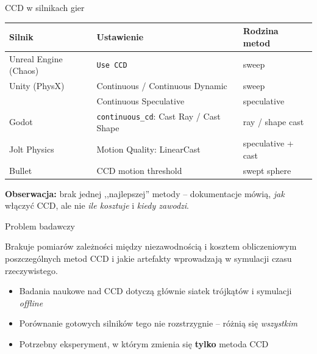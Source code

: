 \documentclass[aspectratio=169, 11pt]{beamer}
\begin{document}
\begin{frame}{CCD w silnikach gier}
  \small
  \renewcommand{\arraystretch}{1.25}
  \begin{tabular}{@{}lll@{}}
    \toprule
    \textbf{Silnik} & \textbf{Ustawienie} & \textbf{Rodzina metod} \\
    \midrule
    Unreal Engine (Chaos) & \texttt{Use CCD} & sweep \\
    Unity (PhysX) & Continuous / Continuous Dynamic & sweep \\
                  & Continuous Speculative & speculative \\
    Godot & \texttt{continuous\_cd}: Cast Ray / Cast Shape & ray / shape cast \\
    Jolt Physics & Motion Quality: LinearCast & speculative + cast \\
    Bullet & CCD motion threshold & swept sphere \\
    \bottomrule
  \end{tabular}
  \vspace{0.35cm}
 
  \normalsize
  {\color{PwrRed}\bfseries Obserwacja:} brak jednej ,,najlepszej'' metody -- dokumentacje mówią, \emph{jak} włączyć CCD, ale nie \emph{ile kosztuje} i \emph{kiedy zawodzi}.
\end{frame}
 
\begin{frame}{Problem badawczy}
  \begin{block}{}
    \large
    Brakuje pomiarów zależności między niezawodnością i kosztem obliczeniowym poszczególnych metod CCD i jakie artefakty wprowadzają w symulacji czasu rzeczywistego.
  \end{block}
  \vspace{0.3cm}
  \begin{itemize}\itemsep0.3em
    \item Badania naukowe nad CCD dotyczą głównie siatek trójkątów i symulacji \emph{offline}
    \item Porównanie gotowych silników tego nie rozstrzygnie -- różnią się \emph{wszystkim}
    \item Potrzebny eksperyment, w którym zmienia się \textbf{tylko} metoda CCD
  \end{itemize}
\end{frame}
 
\end{document}
